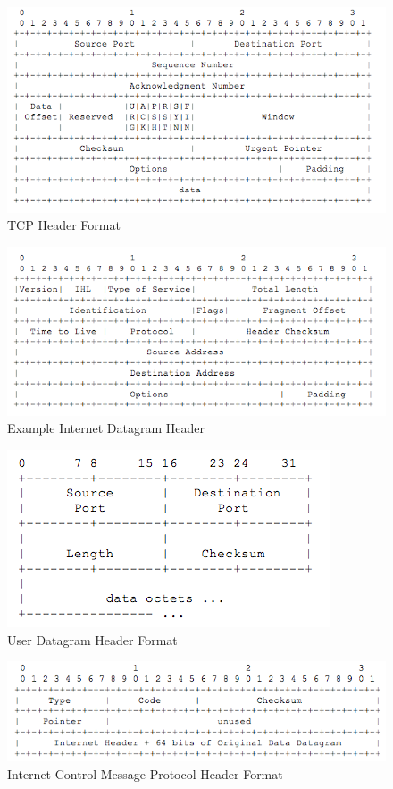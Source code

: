 \documentclass[12pt,letterpaper]{report}
\begin{document}
\begin{figure}[!htp]
\includegraphics[width=\linewidth]{figure1.png}
\caption{TCP Header Format}
\label{tcpheader}
\end{figure}

\begin{figure}[!htp]
\includegraphics[width=\linewidth]{figure2.png}
\caption{Example Internet Datagram Header}
\label{ipheader}
\end{figure}

\begin{figure}[!htp]
\centering
\includegraphics[width=0.5\linewidth]{figure3.png}
\caption{User Datagram Header Format}
\label{udpheader}
\end{figure}

\begin{figure}[!htp]
\includegraphics[width=\linewidth]{figure4.png}
\caption{Internet Control Message Protocol Header Format}
\label{icmpheader}
\end{figure}
\end{document}

